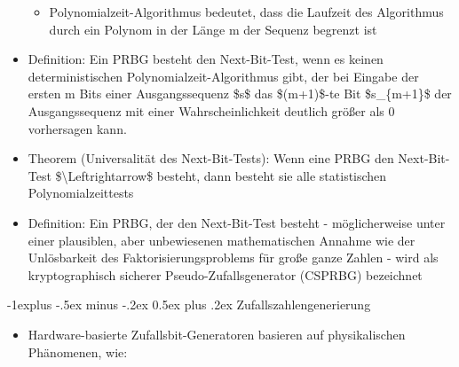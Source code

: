 \documentclass[a4paper]{article}
\makeatletter
\renewcommand{\subsection}{\@startsection{subsection}{2}{0mm}%
 {-1explus -.5ex minus -.2ex}%
 {0.5ex plus .2ex}%
 {\normalfont\normalsize\bfseries}}
\makeatother
\begin{document}
\begin{multicols}{3}
\begin{itemize}
              \begin{itemize}
                  \item
                        Polynomialzeit-Algorithmus bedeutet, dass die Laufzeit des
                        Algorithmus durch ein Polynom in der Länge m der Sequenz begrenzt
                        ist
              \end{itemize}
        \item
              Definition: Ein PRBG besteht den Next-Bit-Test, wenn es keinen
              deterministischen Polynomialzeit-Algorithmus gibt, der bei Eingabe der
              ersten m Bits einer Ausgangssequenz \$s\$ das \$(m+1)\$-te Bit
              \$s\_\{m+1\}\$ der Ausgangssequenz mit einer Wahrscheinlichkeit
              deutlich größer als 0 vorhersagen kann.
        \item
              Theorem (Universalität des Next-Bit-Tests): Wenn eine PRBG den
              Next-Bit-Test \$\textbackslash Leftrightarrow\$ besteht, dann besteht
              sie alle statistischen Polynomialzeittests
        \item
              Definition: Ein PRBG, der den Next-Bit-Test besteht - möglicherweise
              unter einer plausiblen, aber unbewiesenen mathematischen Annahme wie
              der Unlösbarkeit des Faktorisierungsproblems für große ganze Zahlen -
              wird als kryptographisch sicherer Pseudo-Zufallsgenerator (CSPRBG)
              bezeichnet
    \end{itemize}


    \subsection{Zufallszahlengenerierung}

    \begin{itemize}
        \item
              Hardware-basierte Zufallsbit-Generatoren basieren auf physikalischen
              Phänomenen, wie:


\end{itemize}
\end{multicols}
\end{document}
